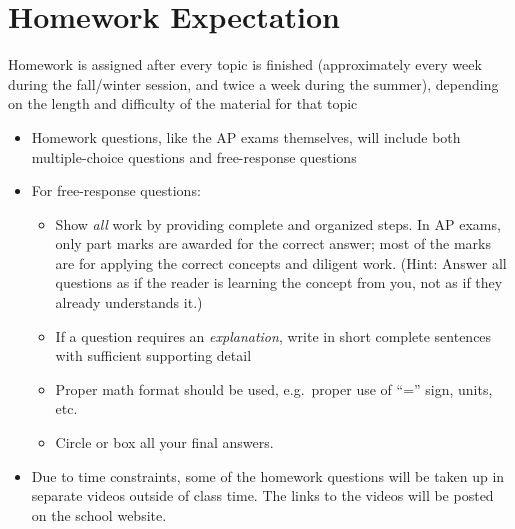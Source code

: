\documentclass{../../oss-handout}
\begin{document}
\section*{Homework Expectation}
Homework is assigned after every topic is finished (approximately every
week during the fall/winter session, and twice a week during the summer),
depending on the length and difficulty of the material for that topic
\begin{itemize}[nosep,leftmargin=15pt]
\item Homework questions, like the AP exams themselves, will include both
  multiple-choice questions and free-response questions
\item For free-response questions:
  \begin{itemize}[nosep,leftmargin=15pt]
  \item Show \emph{all} work by providing complete and organized steps. In AP
    exams, only part marks are awarded for the correct answer; most of the
    marks are for applying the correct concepts and diligent work. (Hint:
    Answer all questions as if the reader is learning the concept from you, not
    as if they already understands it.)
  \item If a question requires an \emph{explanation}, write in short complete
    sentences with sufficient supporting detail
  \item Proper math format should be used, e.g.\ proper use of ``='' sign,
    units, etc.
  \item Circle or box all your final answers.
  \end{itemize}
\item Due to time constraints, some of the homework questions will be taken up
  in separate videos outside of class time. The links to the videos will be
  posted on the school website.
\end{itemize}
%
%
\end{document}
